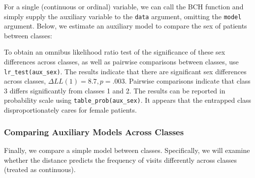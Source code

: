 \documentclass[
  man,floatsintext]{apa6}
\newenvironment{Shaded}{\begin{snugshade}}{\end{snugshade}}
\newcommand{\AttributeTok}[1]{\textcolor[rgb]{0.77,0.63,0.00}{#1}}
\newcommand{\FunctionTok}[1]{\textcolor[rgb]{0.00,0.00,0.00}{#1}}
\newcommand{\NormalTok}[1]{#1}
\newcommand{\OtherTok}[1]{\textcolor[rgb]{0.56,0.35,0.01}{#1}}
\newcommand{\SpecialCharTok}[1]{\textcolor[rgb]{0.00,0.00,0.00}{#1}}
\newcommand{\StringTok}[1]{\textcolor[rgb]{0.31,0.60,0.02}{#1}}
\begin{document}
For a single (continuous or ordinal) variable, we can call the BCH function and simply supply the auxiliary variable to the \texttt{data} argument, omitting the \texttt{model} argument.
Below, we estimate an auxiliary model to compare the sex of patients between classes:

\begin{Shaded}
\end{Shaded}

To obtain an omnibus likelihood ratio test of the significance of these sex differences across classes, as well as pairwise comparisons between classes, use \texttt{lr\_test(aux\_sex)}.
The results indicate that there are significant sex differences across classes, \(\Delta LL(1) = 8.7, p = .003\).
Pairwise comparisons indicate that class 3 differs significantly from classes 1 and 2.
The results can be reported in probability scale using \texttt{table\_prob(aux\_sex)}.
It appears that the entrapped class disproportionately cares for female patients.

\hypertarget{comparing-auxiliary-models-across-classes}{%
\subsubsection{Comparing Auxiliary Models Across Classes}\label{comparing-auxiliary-models-across-classes}}

Finally, we compare a simple model between classes.
Specifically, we will examine whether the distance predicts the frequency of visits differently across classes (treated as continuous).

\begin{Shaded}
\end{Shaded}
\end{document}
